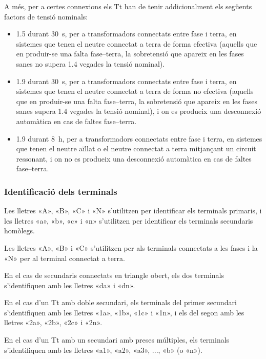 A més, per a certes connexions els Tt han de tenir addicionalment els següents factors de tensió nominals:
 \begin{itemize}
   \item \num{1,5} durant \SI{30}{s},  per a transformadors connectats entre fase i terra, en sistemes que tenen el neutre connectat a terra de forma efectiva (aquells que en produir-se una falta fase--terra, la sobretensió que apareix en les fases sanes no supera \num{1,4} vegades la tensió nominal).
   \item \num{1,9} durant \SI{30}{s},  per a transformadors connectats entre fase i terra, en sistemes que tenen el neutre connectat a terra de forma no efectiva (aquells que en produir-se una falta fase--terra, la sobretensió que apareix en les fases sanes  supera \num{1,4} vegades la tensió nominal), i on es produeix una desconnexió automàtica  en cas de faltes fase--terra.
   \item \num{1,9} durant \SI{8}{h},  per a transformadors connectats entre fase i terra, en sistemes que tenen el neutre aïllat o el neutre connectat a terra mitjançant un circuit ressonant, i on no es produeix una desconnexió automàtica  en cas de faltes fase--terra.
\end{itemize}

\subsubsection{Identificació dels terminals}

 Les lletres «A», «B», «C» i «N» s'utilitzen per identificar els terminals primaris, i les lletres «a», «b», «c» i «n» s'utilitzen per identificar els terminals secundaris homòlegs.

 Les lletres «A», «B» i «C» s'utilitzen per als terminals connectats a les fases i la «N» per al terminal connectat a terra.

 En el cas de secundaris connectats en triangle obert, els dos terminals s'identifiquen amb les lletres «da» i «dn».

 En el cas d'un Tt amb doble secundari, els terminals del  primer secundari s'identifiquen amb les lletres  «1a», «1b», «1c» i «1n», i els del segon amb les lletres  «2a», «2b», «2c» i «2n».

 En el cas d'un Tt amb un  secundari amb preses múltiples, els terminals s'identifiquen amb les lletres  «a1», «a2», «a3», ..., «b» (o «n»).

